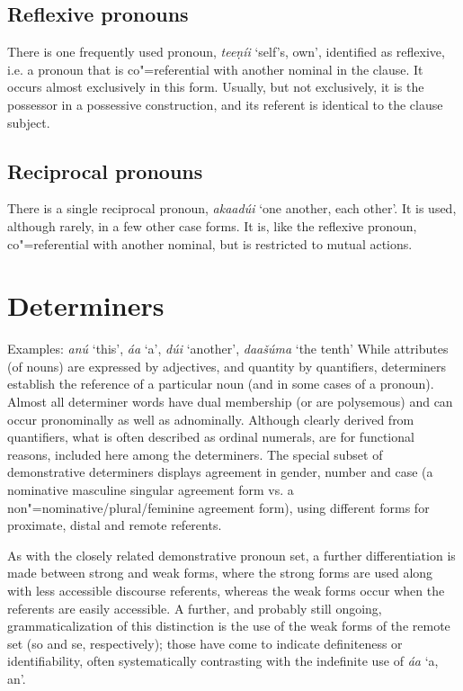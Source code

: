 \subsection{Reflexive pronouns}
\label{subsec:3b-6-4}
There is one frequently used pronoun, \textit{teeṇíi} `self’s, own', identified as reflexive, i.e. a pronoun that is co"=referential with another nominal in the clause. It occurs almost exclusively in this form. Usually, but not exclusively, it is the possessor in a possessive construction, and its referent is identical to the clause subject.


\subsection{Reciprocal pronouns}
\label{subsec:3b-6-5}
There is a single reciprocal pronoun, \textit{akaadúi} `one another, each other'. It is used, although rarely, in a few other case forms. It is, like the reflexive pronoun, co"=referential with another nominal, but is restricted to mutual actions.


\section{Determiners}
\label{sec:3b-7}
Examples: \textit{anú} `this', \textit{áa} `a', \textit{dúi} `another', \textit{daašúma} `the tenth'
While attributes (of nouns) are expressed by adjectives, and quantity by quantifiers, determiners establish the reference of a particular noun (and in some cases of a pronoun). Almost all determiner words have dual membership (or are polysemous) and can occur pronominally as well as adnominally. Although clearly derived from quantifiers, what is often described as ordinal numerals, are for functional reasons, included here among the determiners. The special subset of demonstrative determiners displays agreement in gender, number and case (a nominative masculine singular agreement form vs. a non"=nominative/plural/feminine agreement form), using different forms for proximate, distal and remote referents.


As with the closely related demonstrative pronoun set, a further differentiation is made between strong and weak forms, where the strong forms are used along with less accessible discourse referents, whereas the weak forms occur when the referents are easily accessible. A further, and probably still ongoing, grammaticalization of this distinction is the use of the weak forms of the remote set (so and se, respectively); those have come to indicate definiteness or identifiability, often systematically contrasting with the indefinite use of \textit{áa} `a, an'.


